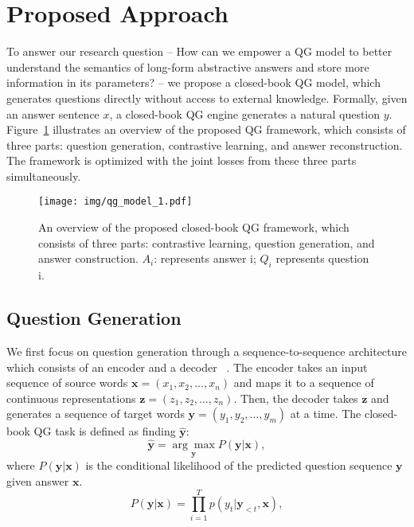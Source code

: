 \documentclass[11pt]{article}
\begin{document}
\section{Proposed Approach}
\label{sec:approach}

To answer our research question -- How can we empower a QG model to better understand the semantics of long-form abstractive answers and store more information in its parameters? -- we propose a closed-book QG model, which generates questions directly without access to external knowledge.
Formally, given an answer sentence $x$, a closed-book QG engine generates a natural question $y$.
Figure~\ref{fig:qg-framework} illustrates an overview of the proposed QG framework, which consists of three parts: question generation, contrastive learning, and answer reconstruction.
The framework is optimized with the joint losses from these three parts simultaneously.

\begin{figure}[htbp!]
\centering
\texttt{[image: img/qg\_model\_1.pdf]}
\caption{An overview of the proposed closed-book QG framework, which consists of three parts: contrastive learning, question generation, and answer construction. \textbf{$A_{i}$}: represents answer i; \textbf{$Q_{i}$} represents question i.}    
\label{fig:qg-framework}
\end{figure}
\vspace{-0.1cm}

\subsection{Question Generation}
\label{subsec:qg}
We first focus on question generation through a  sequence-to-sequence architecture which consists of an encoder and a decoder ~\cite{sutskever-etal-2014-sequencetosequence,vaswani-etal-2017-attention}. 
The encoder takes an input sequence of source words $\textbf{x} = (x_1, x_2, \dots, x_n)$ and maps it to a sequence of continuous representations $\textbf{z} = (z_1, z_2, \dots, z_n)$. 
Then, the decoder takes $\textbf{z}$ and generates a sequence of target words $\textbf{y} = (y_1, y_2, \dots, y_m)$ at a time.
The closed-book QG task is defined as finding $\hat{\textbf{y}}$:
\begin{equation}
    \hat{\textbf{y}}=\underset{\textbf{y}}{\arg\max} P(\textbf{y}|\textbf{x}),
\end{equation}
where $P(\textbf{y}|\textbf{x})$ is the conditional likelihood of the predicted question sequence $\textbf{y}$ given answer $\textbf{x}$.
\begin{equation}
    P(\textbf{y}|\textbf{x})=\prod_{i=1}^{T}p(y_{t}|\textbf{y}_{<t},\textbf{x}),
\end{equation}
\end{document}
